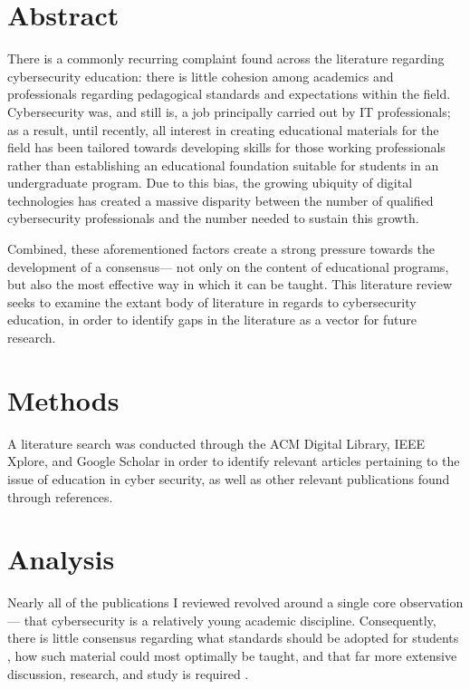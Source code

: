 \section{Abstract}


    There is a commonly recurring complaint found across the literature regarding cybersecurity education: there is little cohesion among academics and professionals regarding pedagogical standards and expectations within the field. %
Cybersecurity was, and still is, a job principally carried out by IT professionals; %
as a result, until recently, all interest in creating educational materials for the field has been tailored towards developing skills for those working professionals rather than establishing an educational foundation suitable for students in an undergraduate program. %
Due to this bias, the growing ubiquity of digital technologies has created a massive disparity between the number of qualified cybersecurity professionals and the number needed to sustain this growth. 
    
    Combined, these aforementioned factors create a strong pressure towards the development of a consensus---%
not only on the content of educational programs, but also the most effective way in which it can be taught. %
This literature review seeks to examine the extant body of literature in regards to cybersecurity education, in order to identify gaps in the literature as a vector for future research.

\section{Methods}

    A literature search was conducted through the ACM Digital Library, IEEE Xplore, and Google Scholar in order to identify relevant articles pertaining to the issue of education in cyber security, as well as other relevant publications found through references.

\section{Analysis}

    Nearly all of the publications I reviewed revolved around a single core observation---%
that cybersecurity is a relatively young academic discipline. %
Consequently, there is little consensus regarding what standards should be adopted for students \cite{R-Raj}, how such material could most optimally be taught, and that far more extensive discussion, research, and study is required \cite{Z-Zeng}. %


